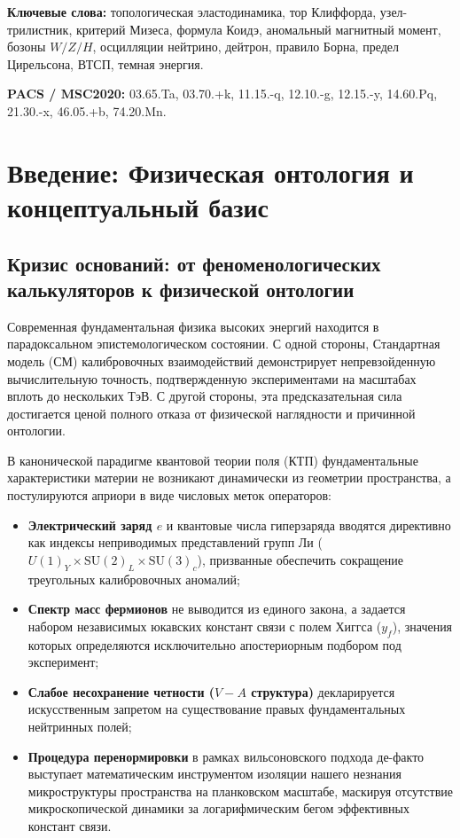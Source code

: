 \documentclass[11pt,a4paper]{article}
\theoremstyle{definition}
\theoremstyle{remark}
\begin{document}
\vspace{2mm}
\noindent\textbf{Ключевые слова:} топологическая эластодинамика, тор Клиффорда, узел-трилистник, критерий Мизеса, формула Коидэ, аномальный магнитный момент, бозоны $W/Z/H$, осцилляции нейтрино, дейтрон, правило Борна, предел Цирельсона, ВТСП, темная энергия.

\vspace{1mm}
\noindent\textbf{PACS / MSC2020:} 03.65.Ta, 03.70.+k, 11.15.-q, 12.10.-g, 12.15.-y, 14.60.Pq, 21.30.-x, 46.05.+b, 74.20.Mn.


\section{Введение: Физическая онтология и концептуальный базис}
\label{sec:introduction}

\subsection{Кризис оснований: от феноменологических калькуляторов к физической онтологии}
Современная фундаментальная физика высоких энергий находится в парадоксальном эпистемологическом состоянии. С одной стороны, Стандартная модель (СМ) калибровочных взаимодействий демонстрирует непревзойденную вычислительную точность, подтвержденную экспериментами на масштабах вплоть до нескольких ТэВ. С другой стороны, эта предсказательная сила достигается ценой полного отказа от физической наглядности и причинной онтологии. 

В канонической парадигме квантовой теории поля (КТП) фундаментальные характеристики материи не возникают динамически из геометрии пространства, а постулируются априори в виде числовых меток операторов:
\begin{itemize}
    \item \textbf{Электрический заряд $e$} и квантовые числа гиперзаряда вводятся директивно как индексы неприводимых представлений групп Ли ($U(1)_Y \times \mathrm{SU}(2)_L \times \mathrm{SU}(3)_c$), призванные обеспечить сокращение треугольных калибровочных аномалий;
    \item \textbf{Спектр масс фермионов} не выводится из единого закона, а задается набором независимых юкавских констант связи с полем Хиггса ($y_f$), значения которых определяются исключительно апостериорным подбором под эксперимент;
    \item \textbf{Слабое несохранение четности ($V-A$ структура)} декларируется искусственным запретом на существование правых фундаментальных нейтринных полей;
    \item \textbf{Процедура перенормировки} в рамках вильсоновского подхода де-факто выступает математическим инструментом изоляции нашего незнания микроструктуры пространства на планковском масштабе, маскируя отсутствие микроскопической динамики за логарифмическим бегом эффективных констант связи.
\end{itemize}
\end{document}
